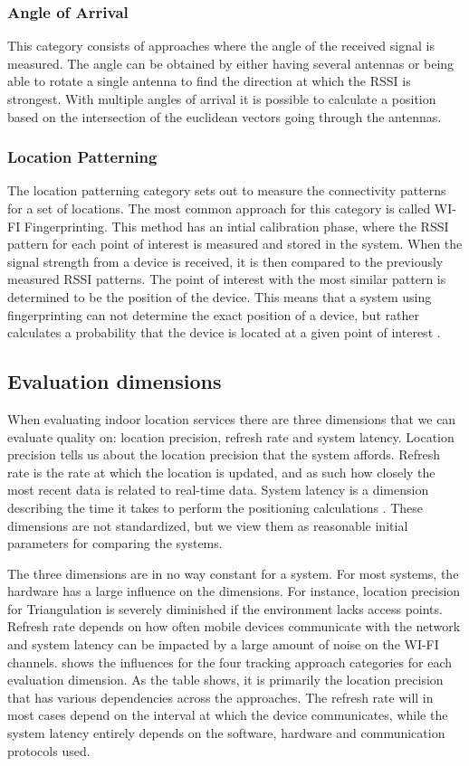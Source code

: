 \subsubsection*{Angle of Arrival}
This category consists of approaches where the angle of the received signal is measured. The angle can be obtained by either having several antennas or being able to rotate a single antenna to find the direction at which the RSSI is strongest. With multiple angles of arrival it is possible to calculate a position based on the intersection of the euclidean vectors going through the antennas. 

\subsubsection*{Location Patterning}
The location patterning category sets out to measure the connectivity patterns for a set of locations. The most common approach for this category is called WI-FI Fingerprinting. This method has an intial calibration phase, where the RSSI pattern for each point of interest is measured and stored in the system. When the signal strength from a device is received, it is then compared to the previously measured RSSI patterns. The point of interest with the most similar pattern is determined to be the position of the device. This means that a system using fingerprinting can not determine the exact position of a device, but rather calculates a probability that the device is located at a given point of interest \cite{fingerprint1}.

\subsection{Evaluation dimensions}
When evaluating indoor location services there are three dimensions that we can evaluate quality on: location precision, refresh rate and system latency. Location precision tells us about the location precision that the system affords. Refresh rate is the rate at which the location is updated, and as such how closely the most recent data is related to real-time data. System latency is a dimension describing the time it takes to perform the positioning calculations \cite{dimensions}. These dimensions are not standardized, but we view them as reasonable initial parameters for comparing the systems.

The three dimensions are in no way constant for a system. For most systems, the hardware has a large influence on the dimensions. For instance, location precision for Triangulation is severely diminished if the environment lacks access points. Refresh rate depends on how often mobile devices communicate with the network and system latency can be impacted by a large amount of noise on the WI-FI channels.  shows the influences for the four tracking approach categories for each evaluation dimension. As the table shows, it is primarily the location precision that has various dependencies across the approaches. The refresh rate will in most cases depend on the interval at which the device communicates, while the system latency entirely depends on the software, hardware and communication protocols used.

